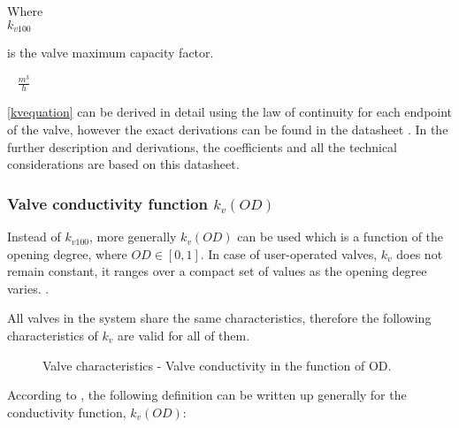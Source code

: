 \begin{minipage}[t]{0.20\textwidth}
Where\\
\hspace*{8mm} $k_{v100}$ 
\end{minipage}
\begin{minipage}[t]{0.68\textwidth}
\vspace*{2mm}
is the valve maximum capacity factor.
 \end{minipage}
\begin{minipage}[t]{0.10\textwidth}
\vspace*{2mm}
\textcolor{White}{te}$\unit{\frac{m^{3}}{h}}$
\end{minipage}

\eqref{kvequation} can be derived in detail using the law of continuity for each endpoint of the valve, however the exact derivations can be found in the datasheet \cite{kvvalve}. In the further description and derivations, the coefficients and all the technical considerations are based on this datasheet.  

\subsubsection{Valve conductivity function \texorpdfstring{$k_v(OD)$}{}}
\label{OD}

Instead of $k_{v100}$, more generally $k_v(OD)$ can be used which is a function of the opening degree, where $OD \in  [0,1]$. In case of user-operated valves, $k_{v}$ does not remain constant, it ranges over a compact set of values as the opening degree varies. \cite{Kallesoe2009}.

All valves in the system share the same characteristics, therefore the following characteristics of $k_{v}$ are valid for all of them. 


\begin{figure}[H]
\centering
 
\caption{Valve characteristics - Valve conductivity in the function of OD.}
\label{valve_conductivity}
\end{figure}

According to \cite{keller}, the following definition can be written up generally for the conductivity function, $k_v(OD)$:


